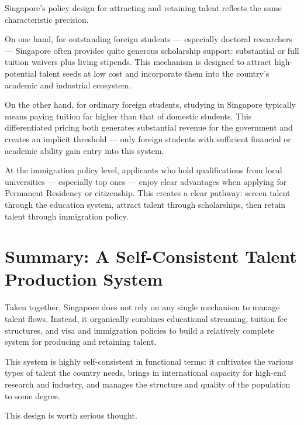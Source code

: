 Singapore's policy design for attracting and retaining talent reflects the same characteristic precision.

On one hand, for outstanding foreign students --- especially doctoral researchers --- Singapore often provides quite generous scholarship support: substantial or full tuition waivers plus living stipends. This mechanism is designed to attract high-potential talent seeds at low cost and incorporate them into the country's academic and industrial ecosystem.

On the other hand, for ordinary foreign students, studying in Singapore typically means paying tuition far higher than that of domestic students. This differentiated pricing both generates substantial revenue for the government and creates an implicit threshold --- only foreign students with sufficient financial or academic ability gain entry into this system.

At the immigration policy level, applicants who hold qualifications from local universities --- especially top ones --- enjoy clear advantages when applying for Permanent Residency or citizenship. This creates a clear pathway: screen talent through the education system, attract talent through scholarships, then retain talent through immigration policy.

\section{Summary: A Self-Consistent Talent Production System}

Taken together, Singapore does not rely on any single mechanism to manage talent flows. Instead, it organically combines educational streaming, tuition fee structures, and visa and immigration policies to build a relatively complete system for producing and retaining talent.

This system is highly self-consistent in functional terms: it cultivates the various types of talent the country needs, brings in international capacity for high-end research and industry, and manages the structure and quality of the population to some degree.

This design is worth serious thought.
